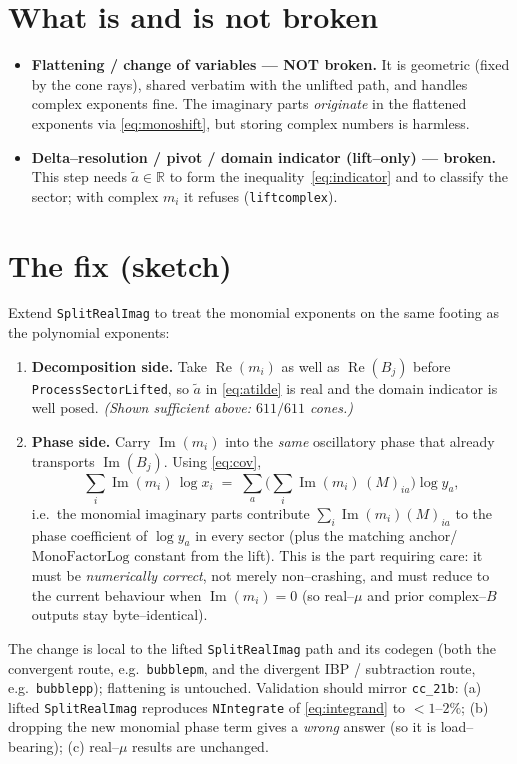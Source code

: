 \documentclass[11pt]{article}
\newcommand{\Real}{\operatorname{Re}}
\newcommand{\Imag}{\operatorname{Im}}
\newcommand{\atil}{\tilde{a}}
\newcommand{\code}[1]{\texttt{#1}}
\begin{document}
\section{What is and is not broken}

\begin{itemize}
  \item \textbf{Flattening / change of variables --- NOT broken.} It is geometric
  (fixed by the cone rays), shared verbatim with the unlifted path, and handles
  complex exponents fine. The imaginary parts \emph{originate} in the flattened
  exponents via \eqref{eq:monoshift}, but storing complex numbers is harmless.
  \item \textbf{Delta--resolution / pivot / domain indicator (lift--only) ---
  broken.} This step needs $\atil\in\mathbb{R}$ to form the
  inequality~\eqref{eq:indicator} and to classify the sector; with complex $m_i$ it
  refuses (\code{liftcomplex}).
\end{itemize}

\section{The fix (sketch)}

Extend \code{SplitRealImag} to treat the monomial exponents on the same footing as
the polynomial exponents:
\begin{enumerate}
  \item \textbf{Decomposition side.} Take $\Real(m_i)$ as well as $\Real(B_j)$ before
  \code{ProcessSectorLifted}, so $\atil$ in \eqref{eq:atilde} is real and the domain
  indicator is well posed. \emph{(Shown sufficient above: $611/611$ cones.)}
  \item \textbf{Phase side.} Carry $\Imag(m_i)$ into the \emph{same} oscillatory phase
  that already transports $\Imag(B_j)$. Using \eqref{eq:cov},
  \[
    \sum_i \Imag(m_i)\,\log x_i
    \;=\; \sum_a \Big(\textstyle\sum_i \Imag(m_i)\,(M)_{ia}\Big)\log y_a ,
  \]
  i.e.\ the monomial imaginary parts contribute
  $\sum_i \Imag(m_i)(M)_{ia}$ to the phase coefficient of $\log y_a$ in every sector
  (plus the matching anchor/$\mathrm{MonoFactorLog}$ constant from the lift). This is
  the part requiring care: it must be \emph{numerically correct}, not merely
  non--crashing, and must reduce to the current behaviour when $\Imag(m_i)=0$ (so
  real--$\mu$ and prior complex--$B$ outputs stay byte--identical).
\end{enumerate}
The change is local to the lifted \code{SplitRealImag} path and its codegen (both the
convergent route, e.g.\ \code{bubblepm}, and the divergent IBP / subtraction route,
e.g.\ \code{bubblepp}); flattening is untouched. Validation should mirror
\code{cc\_21b}: (a) lifted \code{SplitRealImag} reproduces \code{NIntegrate} of
\eqref{eq:integrand} to $<1$--$2\%$; (b) dropping the new monomial phase term gives a
\emph{wrong} answer (so it is load--bearing); (c) real--$\mu$ results are unchanged.
\end{document}
